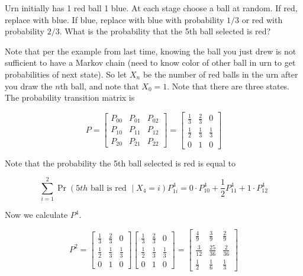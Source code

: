 \begin{example}

Urn initially has 1 red ball 1 blue. At each stage choose a ball at random. If red, replace with blue. If blue, replace with blue with probability \(1/3\) or red with probability \(2/3\). What is the probability that the 5th ball selected is red?
\end{example}

\begin{solution} Note that per the example from last time, knowing the ball you just drew is not sufficient to have a Markov chain (need to know color of other ball in urn to get probabilities of next state). So let \(X_n\) be the number of red balls in the urn after you draw the \(n\)th ball, and note that \(X_0 =1\). Note that there are three states. The probability transition matrix is

\[
P = \begin{bmatrix}
P_{00} & P_{01} & P_{02}  \\
P_{10} & P_{11} & P_{12} \\
P_{20} & P_{21} & P_{22} 
\end{bmatrix} = \begin{bmatrix}
\frac{1}{3} & \frac{2}{3} & 0  \\
\frac{1}{2} & \frac{1}{3} & \frac{1}{3} \\
0 & 1 & 0
\end{bmatrix} 
\]

Note that the probability the 5th ball selected is red is equal to

\[
\sum_{i=1}^2 \Pr(5th \text{ ball is red } \mid X_4 = i) P_{1i}^4 = 0 \cdot P_{10}^4 + \frac{1}{2}P_{11}^4 + 1 \cdot P_{12}^4 
\]

Now we calculate \(P^4\).

\[
P^2 = \begin{bmatrix}
\frac{1}{3} & \frac{2}{3} & 0  \\
\frac{1}{2} & \frac{1}{3} & \frac{1}{3} \\
0 & 1 & 0
\end{bmatrix}  \begin{bmatrix}
\frac{1}{3} & \frac{2}{3} & 0  \\
\frac{1}{2} & \frac{1}{3} & \frac{1}{3} \\
0 & 1 & 0
\end{bmatrix}  = \begin{bmatrix}
\frac{4}{9} & \frac{3}{9} & \frac{2}{9}  \\
\frac{3}{12} & \frac{25}{36} & \frac{2}{36} \\
\frac{1}{2} & \frac{1}{6} & \frac{1}{3}
\end{bmatrix} 
\]


\end{solution}
